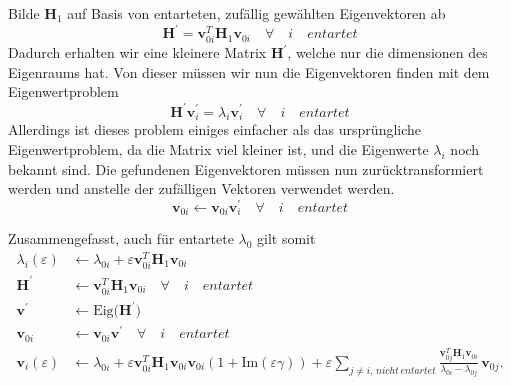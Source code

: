 Bilde $\bm H_1$ auf Basis von entarteten, zufällig gewählten Eigenvektoren ab
\begin{equation*}
    \bm H^\prime = \bm v_{0i}^T \bm H_1 \bm v_{0i} \quad \forall \quad i \quad entartet
\end{equation*}
Dadurch erhalten wir eine kleinere Matrix $\bm H^\prime$, welche nur die dimensionen des Eigenraums hat.
Von dieser müssen wir nun die Eigenvektoren finden mit dem Eigenwertproblem
\begin{equation*}
    \bm H^\prime \bm v_{i}^\prime = \lambda_{i} \bm v_i^\prime \quad \forall \quad i \quad entartet
\end{equation*}
Allerdings ist dieses problem einiges einfacher als das ursprüngliche Eigenwertproblem, da die Matrix viel kleiner ist, und die Eigenwerte $\lambda_i$ noch bekannt sind.
Die gefundenen Eigenvektoren müssen nun zurücktransformiert werden und anstelle der zufälligen Vektoren verwendet werden.
\begin{equation*}
    \bm v_{0i} \gets \bm v_{0i} \bm v_{i}^\prime \quad \forall \quad i \quad entartet
\end{equation*}


Zusammengefasst, auch für entartete $\lambda_0$ gilt somit
\begin{align*}
    \lambda_i(\varepsilon)
    & \gets
    \lambda_{0i} + \varepsilon \bm v_{0i}^T \bm H_1 \bm v_{0i}\\
    \bm H^\prime & \gets \bm v_{0i}^T \bm H_1 \bm v_{0i} \quad \forall \quad i \quad entartet \\
    \bm v^\prime & \gets \mathrm{Eig} \Big( \bm H^\prime \Big) \\
    \bm v_{0i} & \gets \bm v_{0i} \bm v^\prime  \quad \forall \quad i \quad entartet \\
    \bm v_i(\varepsilon)
    & \gets
    \lambda_{0i} + \varepsilon \bm v_{0i}^T \bm H_1 \bm v_{0i}
        \bm v_{0i} ( 1 + \mathrm{Im}(\varepsilon \gamma) ) + \varepsilon \sum_{j \neq i, \,nicht\,entartet}
        \frac{\bm v_{0j}^T \bm H_1 \bm v_{0i}}{\lambda_{0i} - \lambda_{0j}}
        \, \bm v_{0j}.
\end{align*}